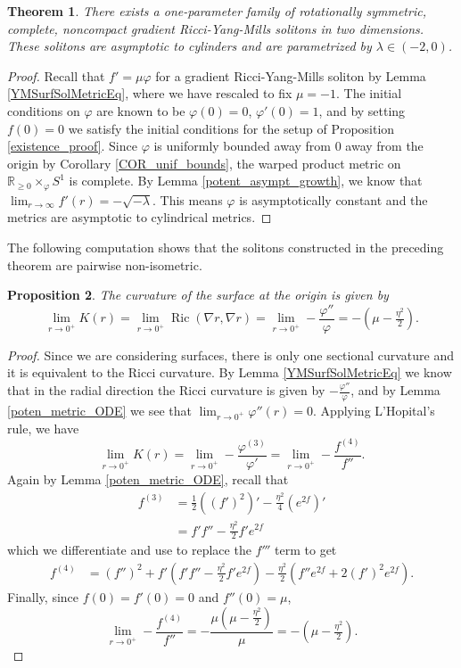 \documentclass[12pt, a4paper, reqno, oneside]{amsart}
\newcommand{\R}{\mathbb{R}}
\renewcommand{\phi}{\varphi}
\newcommand{\grad}{\nabla}
\DeclareMathOperator{\Ric}{Ric}
\numberwithin{equation}{section}
\theoremstyle{plain}
\newtheorem{theorem}{Theorem}[section]
\newtheorem{proposition}[theorem]{Proposition}
\theoremstyle{definition}
\theoremstyle{plain}
\begin{document}
\begin{theorem}
  There exists a one-parameter family of rotationally symmetric, complete, noncompact gradient Ricci-Yang-Mills solitons in two dimensions. These solitons are asymptotic to cylinders and are parametrized by $\lambda\in(-2,0)$. 
\end{theorem}
\begin{proof}
  Recall that $f'=\mu\varphi$ for a gradient Ricci-Yang-Mills soliton by Lemma \ref{YMSurfSolMetricEq}, where we have rescaled to fix $\mu=-1$. The initial conditions on $\varphi$ are known to be $\varphi(0)=0$, $\varphi'(0)=1$, and by setting $f(0)=0$ we satisfy the initial conditions for the setup of Proposition \ref{existence_proof}. Since $\varphi$ is uniformly bounded away from 0 away from the origin by Corollary \ref{COR_unif_bounds}, the warped product metric on $\R_{\geq 0}\times_{\varphi}S^{1}$ is complete. By Lemma \ref{potent_asympt_growth}, we know that $\lim_{r\to\infty}f'(r)=-\sqrt{-\lambda}$. This means $\varphi$ is asymptotically constant and the metrics are asymptotic to cylindrical metrics.
\end{proof}

The following computation shows that the solitons constructed in the preceding theorem are pairwise non-isometric.
\begin{proposition}
  The curvature of the surface at the origin is given by
  \[
    \lim_{r\to 0^{+}}K(r) = \lim_{r\to 0^{+}}\Ric(\grad r,\grad r) = \lim_{r\to 0^{+}}-\frac{\phi''}{\phi} = -(\mu-\tfrac{\eta^{2}}{2}).
  \]
\end{proposition}
\begin{proof}
  Since we are considering surfaces, there is only one sectional curvature and it is equivalent to the Ricci curvature. By Lemma \ref{YMSurfSolMetricEq} we know that in the radial direction the Ricci curvature is given by $-\tfrac{\phi''}{\phi}$, and by Lemma \ref{poten_metric_ODE} we see that $\lim_{r\to 0^+}\phi''(r) = 0$. Applying L'Hopital's rule, we have
  \[
    \lim_{r\to0^{+}}K(r) = \lim_{r\to 0^{+}}-\frac{\phi^{(3)}}{\phi'} = \lim_{r\to 0^{+}}-\frac{f^{(4)}}{f''}.
  \]
  Again by Lemma \ref{poten_metric_ODE}, recall that
  \begin{align*}
    f^{(3)} &= \tfrac{1}{2}\left((f')^{2}\right)'-\tfrac{\eta^{2}}{4}(e^{2f})'\\
      &= f'f''-\tfrac{\eta^{2}}{2}f'e^{2f}
  \end{align*}
  which we differentiate and use to replace the $f'''$ term to get
  \begin{align*}
    f^{(4)} &= (f'')^2+f'(f'f''-\tfrac{\eta^{2}}{2}f'e^{2f})-\tfrac{\eta^{2}}{2}(f''e^{2f}+2(f')^{2}e^{2f}).
  \end{align*}
  Finally, since $f(0)=f'(0)=0$ and $f''(0)=\mu$, 
  \[
    \lim_{r\to 0^{+}}-\frac{f^{(4)}}{f''} = -\frac{\mu(\mu-\tfrac{\eta^{2}}{2})}{\mu} = -\left(\mu-\tfrac{\eta^{2}}{2}\right).
  \]
\end{proof}
\end{document}
